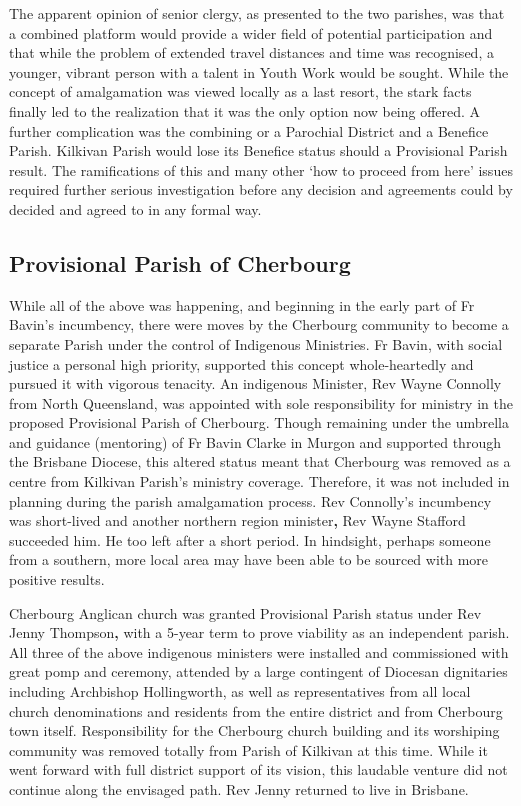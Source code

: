 The apparent opinion of senior clergy, as presented to the two parishes, was that a combined platform would provide a wider field of potential participation and that while the problem of extended travel distances and time was recognised, a younger, vibrant person with a talent in Youth Work would be sought. While the concept of amalgamation was viewed locally as a last resort, the stark facts finally led to the realization that it was the only option now being offered. A further complication was the combining or a Parochial District and a Benefice Parish. Kilkivan Parish would lose its Benefice status should a Provisional Parish result. The ramifications of this and many other `how to proceed from here' issues required further serious investigation before any decision and agreements could by decided and agreed to in any formal way.



\subsection{Provisional Parish of Cherbourg}



While all of the above was happening, and beginning in the early part of Fr Bavin's incumbency, there were moves by the Cherbourg community to become a separate Parish under the control of Indigenous Ministries. Fr Bavin, with social justice a personal high priority, supported this concept whole-heartedly and pursued it with vigorous tenacity. An indigenous Minister, Rev Wayne Connolly from North Queensland, was appointed with sole responsibility for ministry in the proposed Provisional Parish of Cherbourg. Though remaining under the umbrella and guidance (mentoring) of Fr Bavin Clarke in Murgon and supported through the Brisbane Diocese, this altered status meant that Cherbourg was removed as a centre from Kilkivan Parish's ministry coverage. Therefore, it was not included in planning during the parish amalgamation process. Rev Connolly's incumbency was short-lived and another northern region minister\textbf{,} Rev Wayne Stafford succeeded him. He too left after a short period. In hindsight, perhaps someone from a southern, more local area may have been able to be sourced with more positive results.



Cherbourg Anglican church was granted Provisional Parish status under Rev Jenny Thompson\textbf{,} with a 5-year term to prove viability as an independent parish. All three of the above indigenous ministers were installed and commissioned with great pomp and ceremony, attended by a large contingent of Diocesan dignitaries including Archbishop Hollingworth, as well as representatives from all local church denominations and residents from the entire district and from Cherbourg town itself. Responsibility for the Cherbourg church building and its worshiping community was removed totally from Parish of Kilkivan at this time. While it went forward with full district support of its vision, this laudable venture did not continue along the envisaged path. Rev Jenny returned to live in Brisbane.



